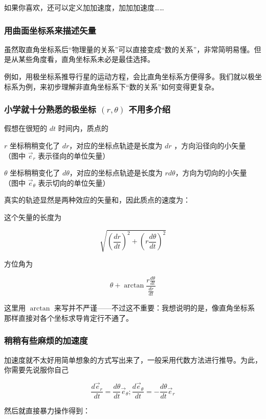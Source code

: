 \documentclass[CJK,13pt]{beamer}
\begin{document}
\begin{frame}
  如果你喜欢，还可以定义加加速度，加加加速度……


\end{frame}




\begin{frame}
  \frametitle{用曲面坐标系来描述矢量}
  虽然取直角坐标系后“物理量的关系”可以直接变成“数的关系”，非常简明易懂。但是从某些角度看，直角坐标系未必是最佳选择。

  \skiplines
  
  例如，用极坐标系推导行星的运动方程，会比直角坐标系方便得多。我们就以极坐标系为例，来初步理解非直角坐标系下“数的关系”如何变得更复杂。
\end{frame}


\begin{frame}
  \frametitle{小学就十分熟悉的极坐标 $(r,\theta)$ 不用多介绍}



  假想在很短的 $dt$ 时间内，质点的
    
  $r$ 坐标稍稍变化了 $dr$，对应的坐标点轨迹是长度为 $dr$ ，方向沿径向的小矢量 （图中 $\vec{e}_r$ 表示径向的单位矢量）

  $\theta$ 坐标稍稍变化了 $d\theta$，对应的坐标点轨迹是长度为 $rd\theta$，方向为切向的小矢量 （图中 $\vec{e}_\theta$ 表示切向的单位矢量）

\end{frame}



\begin{frame}
  真实的轨迹显然是两种效应的矢量和，因此质点的速度为：


  这个矢量的长度为

  $$\sqrt{\left(\frac{dr}{dt}\right)^2+\left(r\frac{d\theta}{dt}\right)^2}$$

  方位角为

  $$\theta + \arctan\frac{r\frac{d\theta}{dt}}{\frac{dr}{dt}}$$

  这里用 $\arctan$ 来写并不严谨——不过这不重要：我想说明的是，像直角坐标系那样直接对各个坐标求导肯定行不通了。

\end{frame}



\begin{frame}
  \frametitle{稍稍有些麻烦的加速度}
  加速度就不太好用简单想象的方式写出来了，一般采用代数方法进行推导。为此，你需要先说服你自己

  $$\frac{d\vec{e}_r}{dt} = \frac{d\theta}{dt} \vec{e}_\theta; \frac{d\vec{e}_\theta}{dt} = - \frac{d\theta}{dt} \vec{e}_r$$

  然后就直接暴力操作得到：
\end{frame}
\end{document}
